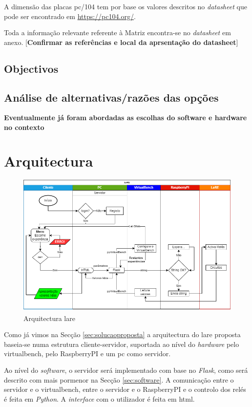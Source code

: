 A dimensão das placas \gls{pc/104} tem por base os valores descritos no \textit{datasheet} que pode ser encontrado em \url{https://pc104.org/}.

Toda a informação relevante referente à Matriz encontra-se no \textit{datasheet} em anexo. [\textbf{Confirmar as referências e local da aprsentação do datasheet}]

\subsection{Objectivos}
\subsection{Análise de alternativas/razões das opções}
\textbf{Eventualmente já foram abordadas as escolhas do software e hardware no contexto}

\section{Arquitectura}
\begin{figure}[hbtp]
    \centering
    \includegraphics[width=1\textwidth]{figures/Diagrama_SOFTWARE.drawio.png}
    \caption{Arquitectura \acrshort{lare}}
    \label{fig:arquitecturalore}
\end{figure}

Como já vimos na Secção \ref{sec:solucaoproposta} a arquitectura do \acrshort{lare} proposta baseia-se numa estrutura cliente-servidor, suportada ao nível do \textit{hardware} pelo \acrshort{virtualbench}, pelo \gls{RaspberryPI} e um \acrshort{pc} como servidor. 

Ao nível do \textit{software}, o servidor será implementado com base no \textit{Flask}, como será descrito com mais pormenor na Secção \ref{sec:software}. A comunicação entre o servidor e o \acrshort{virtualbench}, entre o servidor e o \gls{RaspberryPI} e o controlo dos relés é feita em \textit{Python}. A \textit{interface} com o utilizador é feita em \acrshort{html}.

